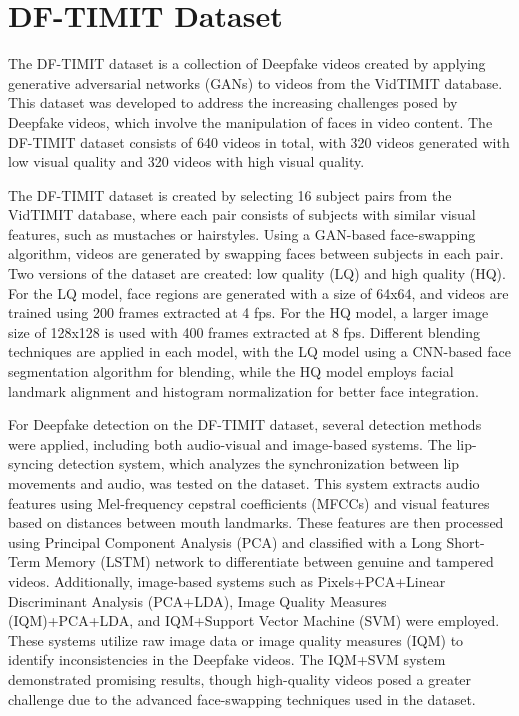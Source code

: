 \documentclass{article} %
\begin{document}
\section{DF-TIMIT Dataset}

The DF-TIMIT dataset is a collection of Deepfake videos created by applying generative adversarial networks (GANs) to videos from the VidTIMIT database. This dataset was developed to address the increasing challenges posed by Deepfake videos, which involve the manipulation of faces in video content. The DF-TIMIT dataset consists of 640 videos in total, with 320 videos generated with low visual quality and 320 videos with high visual quality\cite{Korshunov_2018}. 

The DF-TIMIT dataset is created by selecting 16 subject pairs from the VidTIMIT database, where each pair consists of subjects with similar visual features, such as mustaches or hairstyles. Using a GAN-based face-swapping algorithm, videos are generated by swapping faces between subjects in each pair. Two versions of the dataset are created: low quality (LQ) and high quality (HQ). For the LQ model, face regions are generated with a size of 64x64, and videos are trained using 200 frames extracted at 4 fps. For the HQ model, a larger image size of 128x128 is used with 400 frames extracted at 8 fps. Different blending techniques are applied in each model, with the LQ model using a CNN-based face segmentation algorithm for blending, while the HQ model employs facial landmark alignment and histogram normalization for better face integration\cite{Korshunov_2018}.

For Deepfake detection on the DF-TIMIT dataset, several detection methods were applied, including both audio-visual and image-based systems. The lip-syncing detection system, which analyzes the synchronization between lip movements and audio, was tested on the dataset. This system extracts audio features using Mel-frequency cepstral coefficients (MFCCs)\cite{Le_2016} and visual features based on distances between mouth landmarks. These features are then processed using Principal Component Analysis (PCA) and classified with a Long Short-Term Memory (LSTM) network to differentiate between genuine and tampered videos. Additionally, image-based systems such as Pixels+PCA+Linear Discriminant Analysis\cite{Wen_2015} (PCA+LDA), Image Quality Measures (IQM)\cite{Galbally_2014}+PCA+LDA, and IQM+Support Vector Machine (SVM) were employed. These systems utilize raw image data or image quality measures (IQM) to identify inconsistencies in the Deepfake videos. The IQM+SVM system demonstrated promising results, though high-quality videos posed a greater challenge due to the advanced face-swapping techniques used in the dataset.
\end{document}
